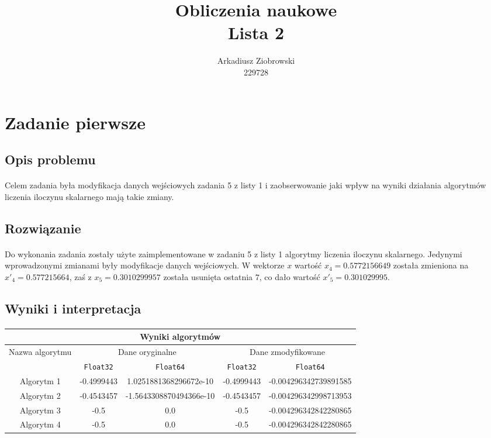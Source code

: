 \documentclass[a4paper]{article}
\title{\huge
  Obliczenia naukowe \\
  \large Lista 2}
\author{Arkadiusz Ziobrowski \\ 229728}
\date{}
\begin{document}
\maketitle

\pagebreak




\section{Zadanie pierwsze}

\subsection{Opis problemu}
\paragraph{}
Celem zadania była modyfikacja danych wejściowych zadania 5 z listy 1 i zaobserwowanie jaki wpływ na wyniki działania algorytmów liczenia iloczynu skalarnego mają takie zmiany.
\subsection{Rozwiązanie}
\paragraph{}
Do wykonania zadania zostały użyte zaimplementowane w zadaniu 5 z listy 1 algorytmy liczenia iloczynu skalarnego. Jedynymi wprowadzonymi zmianami były modyfikacje danych wejściowych. W wektorze $x$ wartość $x_{4} = 0.5772156649$ została zmieniona na $x'_{4} = 0.577215664$, zaś z $x_{5} = 0.3010299957$ została usunięta ostatnia $7$, co dało wartość $x'_{5} = 0.301029995$. 

\subsection{Wyniki i interpretacja}
\paragraph{}
\begin{center}
 \begin{tabular}{ |c | c | c | c | c|  }
 \hline
 \multicolumn{5}{|c|}{Wyniki algorytmów} \\
 \hline
 \multirow{2}{*}{Nazwa algorytmu} & \multicolumn{2}{|c|}{Dane oryginalne} & \multicolumn{2}{|c|}{Dane zmodyfikowane} \\
  \cline{2-5}
 &\texttt{Float32} & \texttt{Float64} & \texttt{Float32} & \texttt{Float64}\\
 \hline
 Algorytm 1 & -0.4999443 & 1.0251881368296672e-10 & -0.4999443 & -0.004296342739891585\\
 Algorytm 2 & -0.4543457 & -1.5643308870494366e-10 & -0.4543457 & -0.004296342998713953\\
 Algorytm 3 & -0.5 & 0.0 & -0.5 & -0.004296342842280865\\
 Algorytm 4 & -0.5 & 0.0 & -0.5 & -0.004296342842280865\\
 \hline
\end{tabular}
\end{center}
\end{document}
